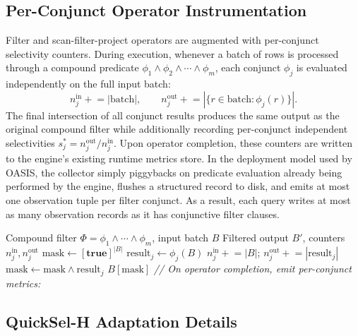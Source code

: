 \subsection{Per-Conjunct Operator Instrumentation}

Filter and scan-filter-project operators are augmented with per-conjunct
selectivity counters. During execution, whenever a batch of rows is processed
through a compound predicate $\phi_1 \wedge \phi_2 \wedge \cdots \wedge \phi_m$,
each conjunct $\phi_j$ is evaluated independently on the full input batch:
\[
  n_j^{\text{in}} \mathrel{+}= |\text{batch}|, \qquad
  n_j^{\text{out}} \mathrel{+}= |\{r \in \text{batch} : \phi_j(r)\}|.
\]
The final intersection of all conjunct results produces the same output as
the original compound filter while additionally recording per-conjunct
independent selectivities $s^*_j = n_j^{\text{out}} / n_j^{\text{in}}$.
Upon operator completion, these counters are written to the engine's existing
runtime metrics store. In the deployment model used by OASIS, the collector
simply piggybacks on predicate evaluation already being performed by the
engine, flushes a structured record to disk, and emits at most one
observation tuple per filter conjunct. As a result, each query writes at
most as many observation records as it has conjunctive filter clauses.

\begin{algorithm}[H]\small
\caption{Per-Conjunct Operator Instrumentation}
\label{alg:instrument}
\begin{algorithmic}[1]
\Require Compound filter $\Phi = \phi_1 \wedge \cdots \wedge \phi_m$, input batch $B$
\Ensure  Filtered output $B'$, counters $n_j^{\text{in}}, n_j^{\text{out}}$
\State $\text{mask} \leftarrow [\textbf{true}]^{|B|}$
  \State $\text{result}_j \leftarrow \phi_j(B)$
  \State $n_j^{\text{in}} \mathrel{+}= |B|$; \quad $n_j^{\text{out}} \mathrel{+}= |\text{result}_j|$
  \State $\text{mask} \leftarrow \text{mask} \wedge \text{result}_j$
\EndFor
\State \Return $B[\text{mask}]$
\Statex
\Statex \textit{// On operator completion, emit per-conjunct metrics:}
  \State {}
\EndFor
\end{algorithmic}
\end{algorithm}

\subsection{QuickSel-H Adaptation Details}


